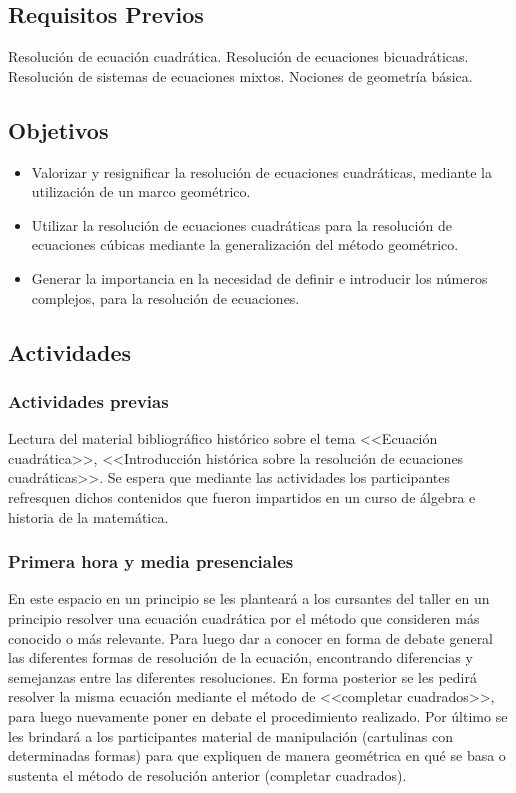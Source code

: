 \subsection{Requisitos Previos}

Resolución de ecuación cuadrática. Resolución de ecuaciones bicuadráticas. Resolución de sistemas de ecuaciones mixtos. Nociones de geometría básica.

\subsection{Objetivos}
\begin{itemize}
	\item Valorizar y resignificar la resolución de ecuaciones cuadráticas, mediante la utilización de un marco geométrico.
	\item Utilizar la resolución de ecuaciones cuadráticas para la resolución de ecuaciones cúbicas mediante la generalización del método geométrico.
	\item Generar la importancia en la necesidad de definir e introducir los números complejos, para la resolución de ecuaciones.
\end{itemize}

\subsection{Actividades}

\subsubsection{Actividades previas}

Lectura del material bibliográfico histórico sobre el tema <<Ecuación cuadrática>>, <<Introducción histórica sobre la resolución de ecuaciones cuadráticas>>. Se espera que mediante las actividades los participantes refresquen dichos contenidos que fueron impartidos en un curso de álgebra e historia de la matemática.

\subsubsection{Primera hora y media presenciales}\label{subsec:Primeras-dos-sinc-04}

En este espacio en un principio se les planteará a los cursantes del taller en un principio resolver una ecuación cuadrática por el método que consideren más conocido o más relevante. Para luego dar a conocer en forma de debate general las diferentes formas de resolución de la ecuación, encontrando diferencias y semejanzas entre las diferentes resoluciones. En forma posterior se les pedirá resolver la misma ecuación mediante el método de <<completar cuadrados>>, para luego nuevamente poner en debate el procedimiento realizado. Por último se les brindará a los participantes material de manipulación (cartulinas con determinadas formas) para que expliquen de manera geométrica en qué se basa o sustenta el método de resolución anterior (completar cuadrados). 

